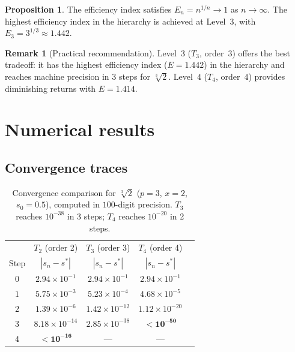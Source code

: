 \documentclass[11pt,a4paper]{article}
\theoremstyle{definition}
\newtheorem{proposition}{Proposition}[section]
\newtheorem{remark}{Remark}[section]
\newcommand{\cbrt}[1]{\sqrt[3]{#1}}
\begin{document}
\begin{proposition}
The efficiency index satisfies $E_n = n^{1/n} \to 1$ as $n \to \infty$.  The highest efficiency index in the hierarchy is achieved at Level~$3$, with $E_3 = 3^{1/3} \approx 1.442$.
\end{proposition}

\begin{remark}[Practical recommendation]
Level~$3$ ($T_3$, order~$3$) offers the best tradeoff: it has the highest efficiency index ($E = 1.442$) in the hierarchy and reaches machine precision in $3$ steps for $\cbrt{2}$.  Level~$4$ ($T_4$, order~$4$) provides diminishing returns with $E = 1.414$.
\end{remark}

\section{Numerical results}
\label{sec:numerical}

\subsection{Convergence traces}

\begin{table}[H]
\centering
\renewcommand{\arraystretch}{1.15}
\begin{tabular}{ccccc}
\toprule
& $T_2$ (order 2) & $T_3$ (order 3) & $T_4$ (order 4) \\
Step & $|s_n - s^*|$ & $|s_n - s^*|$ & $|s_n - s^*|$ \\
\midrule
$0$ & $2.94 \times 10^{-1}$ & $2.94 \times 10^{-1}$ & $2.94 \times 10^{-1}$ \\
$1$ & $5.75 \times 10^{-3}$ & $5.23 \times 10^{-4}$ & $4.68 \times 10^{-5}$ \\
$2$ & $1.39 \times 10^{-6}$ & $1.42 \times 10^{-12}$ & $1.12 \times 10^{-20}$ \\
$3$ & $8.18 \times 10^{-14}$ & $2.85 \times 10^{-38}$ & $\mathbf{< 10^{-50}}$ \\
$4$ & $\mathbf{< 10^{-16}}$ & --- & --- \\
\bottomrule
\end{tabular}
\caption{Convergence comparison for $\cbrt{2}$ ($p=3$, $x=2$, $s_0 = 0.5$), computed in $100$-digit precision.  $T_3$ reaches $10^{-38}$ in 3 steps; $T_4$ reaches $10^{-20}$ in 2 steps.}
\label{tab:traces}
\end{table}
\end{document}

